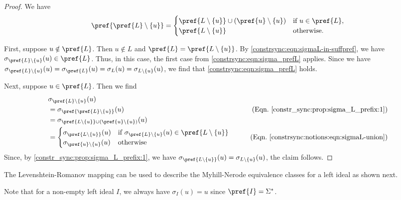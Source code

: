 \begin{proof}
	We have
	\[
	\pref{\pref{L} \setminus \{u\}} = 
	\begin{cases}
		\pref{L \setminus \{u\}} \cup ( \pref{u} \setminus \{u\} ) & \text{if } u \in \pref{L}, \\
		\pref{L \setminus \{u\}} & \text{otherwise.}
	\end{cases}
	\]
	
	First, suppose $u \notin \pref{L}$.
	Then $u \notin L$
	and $\pref{L} = \pref{L \setminus \{u\}}$.
	By \cref{constrsync:eqn:sigmaL-in-suffpref}, we have $\sigma_{\pref{L}\setminus\{u\}}(u) \in \pref{L}$.
	Thus, in this case, the first case from \cref{constrsync:eqn:sigma_prefL}
	applies.
	Since we have $\sigma_{\pref{L}\setminus\{u\}}(u) = \sigma_{\pref{L}}(u) = \sigma_L(u) = \sigma_{L\setminus \{u\}}(u)$,
	we find that \cref{constrsync:eqn:sigma_prefL} holds.
	
	Next, suppose $u \in \pref{L}$.
	Then we find	
	\begin{align*}
		& \sigma_{\pref{L} \setminus \{u\}}(u) \\
		& = \sigma_{\pref{\pref{L} \setminus \{u\}}}(u) & \tag{Eqn.~\eqref{constr_sync:prop:sigma_L_prefix:1}} \\
		& = \sigma_{\pref{L \setminus \{u\}} \cup ( \pref{u} \setminus \{u\} )}(u) \\
		& = \begin{cases}
			\sigma_{\pref{L \setminus \{u\}}}(u) & \text{if } \sigma_{\pref{L} \setminus \{u\}}(u) \in \pref{L \setminus \{u\}} \\
			\sigma_{\pref{u}\setminus\{u\}}(u) & \text{otherwise}		
		\end{cases}	& \tag{Eqn.~\eqref{constrsync:notions:eqn:sigmaL-union}}
	\end{align*}
	Since, by \cref{constr_sync:prop:sigma_L_prefix:1}, we have $\sigma_{\pref{L \setminus \{u\}}}(u) = \sigma_{L \setminus \{u\}}(u)$,
	the claim follows.
\end{proof}

The Levenshtein-Romanov mapping can be used to describe the Myhill-Nerode equivalence classes
for a left ideal as shown next. 

Note that for a non-empty left ideal $I$, 
we always have $\sigma_I(u) = u$ since $\pref{I} = \Sigma^*$.

